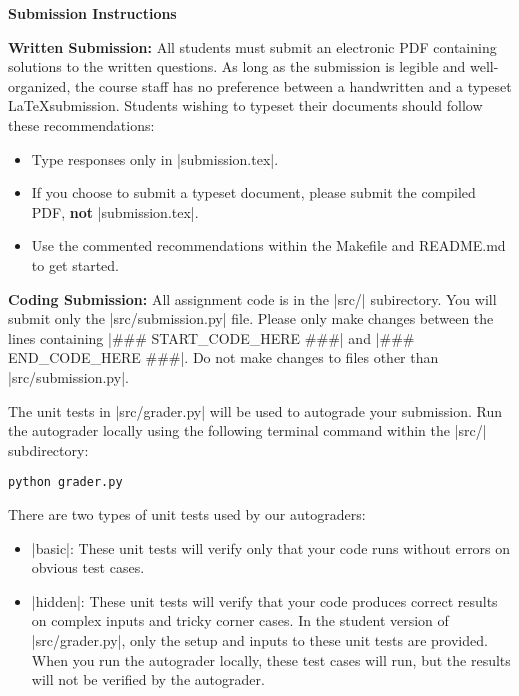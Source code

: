 {\bf Submission Instructions}

{\bf Written Submission:}
All students must submit an electronic PDF containing solutions to the written
questions. As long as the submission is legible and well-organized, the course
staff has no preference between a handwritten and a typeset \LaTeX submission.
Students wishing to typeset their documents should follow these recommendations:
\begin{itemize}
  \item Type responses only in |submission.tex|.
  \item If you choose to submit a typeset document, please submit the compiled
  PDF, {\bf not} |submission.tex|.
  \item Use the commented recommendations within the Makefile and README.md to
  get started.
\end{itemize}

{\bf Coding Submission:}
All assignment code is in the |src/| subirectory.  You will submit only the
|src/submission.py| file.  Please only make changes between the lines containing
|### START_CODE_HERE ###| and |### END_CODE_HERE ###|. Do not make changes to
files other than |src/submission.py|.

The unit tests in |src/grader.py| will be used to autograde your submission.
Run the autograder locally using the following terminal command within the
|src/| subdirectory:
\begin{lstlisting}
python grader.py
\end{lstlisting}

There are two types of unit tests used by our autograders:
\begin{itemize}
  \item |basic|:  These unit tests will verify only that your code runs without
  errors on obvious test cases.
  \item |hidden|: These unit tests will verify that your code produces correct
  results on complex inputs and tricky corner cases.  In the student version of
  |src/grader.py|, only the setup and inputs to these unit tests are provided.
  When you run the autograder locally, these test cases will run, but the
  results will not be verified by the autograder.
\end{itemize}

